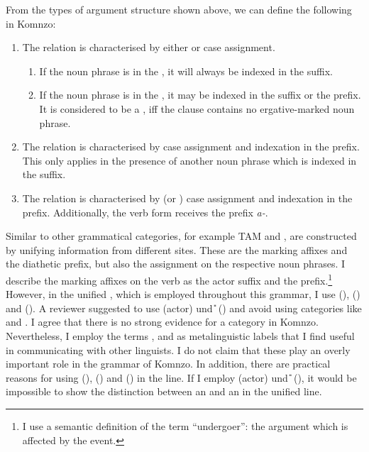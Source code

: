 From the types of argument structure shown above, we can define the following  in Komnzo:

\begin{enumerate}
	\item The  relation is characterised by either  or  case assignment.
	\begin{enumerate}
		\item If the noun phrase is in the , it will always be indexed in the suffix.
		\item If the noun phrase is in the , it may be indexed in the suffix or the prefix. It is considered to be a , iff the clause contains no ergative-marked noun phrase.
	\end{enumerate}
	\item The  relation is characterised by  case assignment and indexation in the prefix. This only applies in the presence of another  noun phrase which is indexed in the suffix.
	\item The  relation is characterised by  (or ) case assignment and indexation in the prefix. Additionally, the verb form receives the  prefix \emph{a-}.
\end{enumerate}%

Similar to other grammatical categories, for example TAM and ,  are constructed by unifying information from different sites. These are the  marking affixes and the diathetic prefix, but also the  assignment on the respective noun phrases. I describe the  marking affixes on the verb as the actor suffix and the  prefix.\footnote{I use a semantic definition of the term ``undergoer'': the argument which is affected by the event.} However, in the unified , which is employed throughout this grammar, I use \Sbj{} (), \Obj{} () and \Io{} (). A reviewer suggested to use \A{} (actor) und \U{} () and avoid using categories like  and . I agree that there is no strong evidence for a  category in Komnzo. Nevertheless, I employ the terms ,  and  as metalinguistic labels that I find useful in communicating with other linguists. I do not claim that these play an overly important role in the grammar of Komnzo. In addition, there are practical reasons for using \Sbj{} (), \Obj{} () and \Io{} () in the  line. If I employ \A{} (actor) und \U{} (), it would be impossible to show the distinction between an  and an  in the unified  line.

